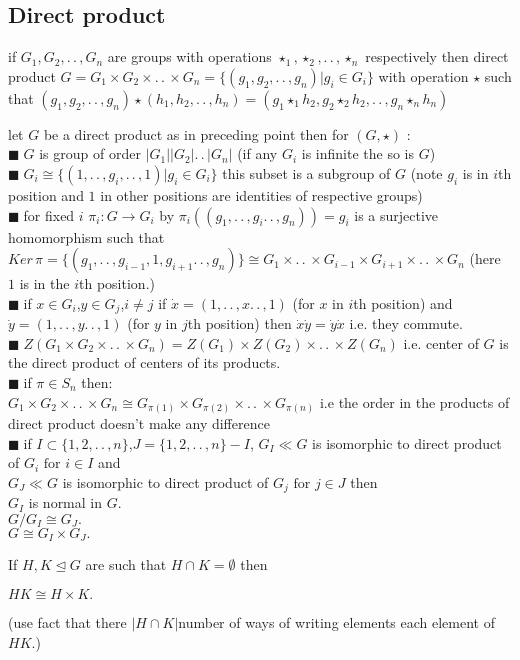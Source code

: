 \documentclass[11pt]{extarticle}
\newcommand{\ra}{\rightarrow}
\newcommand{\w}[1]{\text{#1}}
\newcommand{\ck}{.\,.\,}
\newcommand{\snote}[1]{{\footnotesize(#1)}}
\newcommand{\y}{$\blacksquare\;$}
\newcommand{\tbx}[2][]{
	\begin{tcolorbox}[enhanced,breakable,size=small,colback=black!2!white,title={#1},arc is angular, arc=1.5mm,drop fuzzy shadow]
		#2
	\end{tcolorbox}
}
\begin{document}
\begin{multicols}{2}
		\section{Direct product} 
	\tbx{if $ G_1, G_2 ,\ck , G_n $ are groups with operations $ \star_1, \star_2,\ck , \star_n $ respectively then direct product $ G= G_1\times G_2 \times \ck \times G_n =\{(g_1,g_2,\ck, g_n)|g_i\in G_i\}$ with operation $ \star  $ such that $ (g_1,g_2,\ck, g_n) \star (h_1,h_2,\ck, h_n) =(g_1\star_1 h_2,g_2 \star_2 h_2,\ck, g_n \star_n h_n)$}
	\tbx{ let $ G $ be a direct product as in preceding point then 
		for $ (G,\star) $ :\\
		\y  $ G $ is group of order $ |G_1||G_2|\ck |G_n| $ (if any $ G_i $ is infinite the so is $ G $) \\
		\y  $ G_i \cong \{(1,\ck, g_i,\ck ,1)|g_i\in G_i\} $ this subset is a subgroup of $ G $ \snote{note $ g_i $ is in $ i $th position and $ 1 $ in other positions are identities of respective groups}  \\
		\y  for fixed $ i $ $\pi_i : G \ra G_i  $ by $ \pi_i((g_1,\ck,g_i\ck ,g_n))=g_i $ is a surjective homomorphism such that  
		$ Ker\,\pi =\{(g_1,\ck ,g_{i-1},1,g_{i+1}\ck ,g_n)\} \cong G_1\times \ck \times G_{i-1}\times G_{i+1}\times \ck \times G_n $ \snote{here $ 1 $ is in the $ i $th position.}\\
		\y  if $ x\in G_i $,$ y\in G_j $,$ i\neq j $ if $ \dot{x} =(1,\ck, x\ck ,1)$ \snote{for $ x $ in $ i $th position} and 
		$ \dot{y} =(1,\ck, y\ck ,1)$ \snote{for $ y $ in $ j $th position} then $ \dot{x}\dot{y}=\dot{y}\dot{x} $ i.e. they commute.\\
		\y  $ Z(G_1\times G_2 \times \ck \times G_n ) = Z(G_1)\times Z(G_2 )\times \ck \times Z(G_n )$ i.e. 
		center of $ G $ is the direct product of centers of its products.\\
		\y  if $ \pi \in S_n $ then:\\ 
		$ G_1\times G_2 \times \ck \times G_n \cong G_{\pi(1)}\times G_{\pi(2)} \times \ck \times G_{\pi(n)}  $ i.e the order in the products of direct product doesn't make any difference \\
		\y  if $ I \subset \{1,2,\ck , n\} $,$ J= \{1,2,\ck , n\} -I$, $ G_I \ll G$ is isomorphic  to direct product of $ G_i \w{ for }i\in I$ and \\
		$ G_J \ll G$ is isomorphic to direct product of $ G_j \w{ for }j\in J$ then \\
		$ G_I $ is normal in $ G .$\\
		$ G/G_I\cong G_J.$\\
		$G \cong G_I \times G_J .$
	}
	\tbx[\textbf{Recognition Theorem of Direct product} ]{ If $ H,K \trianglelefteq G $ are such that $ H\cap K =\emptyset$ then 
		\begin{center}
			$ HK\cong H \times K .$
		\end{center} \snote{use fact that there $ |H\cap K| $number of ways of writing elements each element of $ HK .$}}

\end{multicols}
\end{document}
